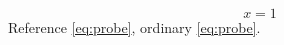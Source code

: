\documentclass{memoir}
\begin{document}
\begin{equation}x=1\label{eq:probe}\end{equation}
Reference \eqref{eq:probe}, ordinary \ref{eq:probe}.
\end{document}
